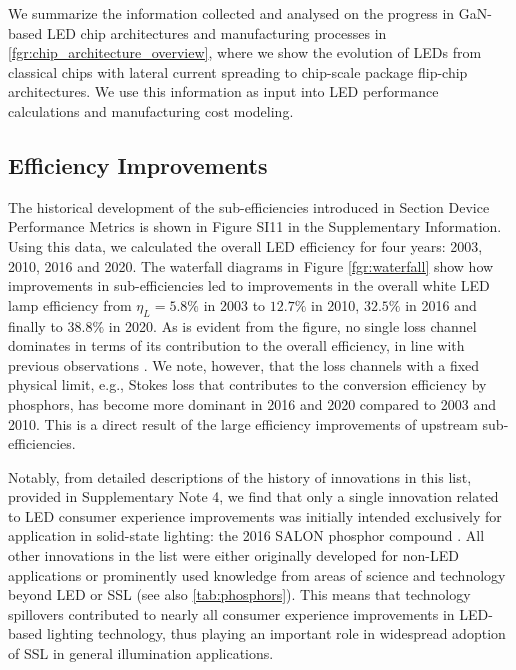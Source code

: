 \documentclass[parskip=full]{article}
\begin{document}
We summarize the information collected and analysed on the progress in GaN-based LED chip architectures and manufacturing processes in \cref{fgr:chip_architecture_overview}, where we show the evolution of LEDs from classical chips with lateral current spreading to chip-scale package flip-chip architectures. We use this information as input into LED performance calculations and manufacturing cost modeling. 

\subsection{Efficiency Improvements}

The historical development of the sub-efficiencies introduced in Section Device Performance Metrics is shown in Figure SI11 in the Supplementary Information. Using this data, we calculated the overall LED efficiency for four years: 2003, 2010, 2016 and 2020. The waterfall diagrams in Figure \ref{fgr:waterfall} show how improvements in sub-efficiencies led to improvements in the overall white LED lamp efficiency from $\eta_L=5.8\%$ in 2003 to $12.7\%$ in 2010, $32.5\%$ in 2016 and finally to $38.8\%$ in 2020. As is evident from the figure, no single loss channel dominates in terms of its contribution to the overall efficiency, in line with previous observations \cite{tsao2010solid}. We note, however, that the loss channels with a fixed physical limit, e.g., Stokes loss that contributes to the conversion efficiency by phosphors, has become more dominant in 2016 and 2020 compared to 2003 and 2010. This is a direct result of the large efficiency improvements of upstream sub-efficiencies.

Notably, from detailed descriptions of the history of innovations in this list, provided in Supplementary Note 4, we find that only a single innovation related to LED consumer experience improvements was initially intended exclusively for application in solid-state lighting: the 2016 SALON phosphor compound \cite{Hoerder2019,seibald2019phosphor}. All other innovations in the list were either originally developed for non-LED applications or prominently used knowledge from areas of science and technology beyond LED or SSL (see also \cref{tab:phosphors}). This means that technology spillovers contributed to nearly all consumer experience improvements in LED-based lighting technology, thus playing an important role in widespread adoption of SSL in general illumination applications. 
\end{document}
